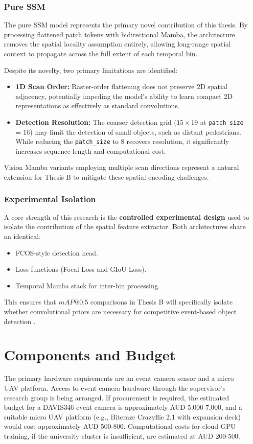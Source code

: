 \documentclass[11pt, a4paper]{report}
\begin{document}
\subsubsection{Pure SSM}
The pure SSM model represents the primary novel contribution of this thesis. By processing flattened patch tokens with bidirectional Mamba, the architecture removes the spatial locality assumption entirely, allowing long-range spatial context to propagate across the full extent of each temporal bin. 

Despite its novelty, two primary limitations are identified:
\begin{itemize}
    \item \textbf{1D Scan Order:} Raster-order flattening does not preserve 2D spatial adjacency, potentially impeding the model's ability to learn compact 2D representations as effectively as standard convolutions.
    \item \textbf{Detection Resolution:} The coarser detection grid ($15 \times 19$ at \texttt{patch\_size} = 16) may limit the detection of small objects, such as distant pedestrians. While reducing the \texttt{patch\_size} to 8 recovers resolution, it significantly increases sequence length and computational cost.
\end{itemize}
Vision Mamba variants employing multiple scan directions \cite{zhu2024vision} represent a natural extension for Thesis B to mitigate these spatial encoding challenges.

\subsubsection{Experimental Isolation}
A core strength of this research is the \textbf{controlled experimental design} used to isolate the contribution of the spatial feature extractor. Both architectures share an identical:
\begin{itemize}
    \item FCOS-style detection head.
    \item Loss functions (Focal Loss and GIoU Loss).
    \item Temporal Mamba stack for inter-bin processing.
\end{itemize}
This ensures that $mAP@0.5$ comparisons in Thesis B will specifically isolate whether convolutional priors are necessary for competitive event-based object detection .

\section{Components and Budget}
The primary hardware requirements are an event camera sensor and a micro UAV platform. Access to event camera hardware through the supervisor's research group is being arranged. If procurement is required, the estimated budget for a DAVIS346 event camera is approximately AUD 5,000-7,000, and a suitable micro UAV platform (e.g., Bitcraze Crazyflie 2.1 with expansion deck) would cost approximately AUD 500-800. Computational costs for cloud GPU training, if the university cluster is insufficient, are estimated at AUD 200-500. 
\end{document}
